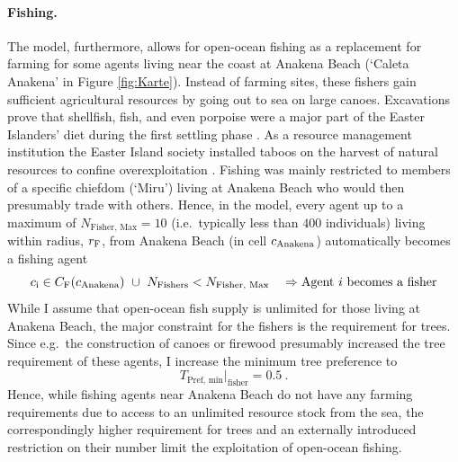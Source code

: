 \paragraph{Fishing.}
The model, furthermore, allows for open-ocean fishing as a replacement for farming for some agents living near the coast at Anakena Beach (`Caleta Anakena' in Figure \ref{fig:Karte}).
Instead of farming sites, these fishers gain sufficient agricultural resources by going out to sea on large canoes.
Excavations prove that shellfish, fish, and even porpoise were a major part of the Easter Islanders' diet during the first settling phase \citep{Bahn2017}.
As a resource management institution the Easter Island society installed taboos on the harvest of natural resources to confine overexploitation \citep{Good2006}. 
Fishing was mainly restricted to members of a specific chiefdom (`Miru') living at Anakena Beach \citep{Bahn2017} who would then presumably trade with others.
Hence, in the model, every agent up to a maximum of $N_\text{Fisher, Max} = 10$ (i.e.\ typically less than $400$ individuals) living within radius, $r_{\rm F}$, from Anakena Beach (in cell $c_{\rm Anakena}$) automatically becomes a fishing agent
\begin{equation}
 	c_{\rm i} \in C_{\rm F}(c_{\rm Anakena}) \  \cup \ N_\text{Fishers}<N_\text{Fisher, Max} \quad \Rightarrow \text{Agent }i\text{ becomes a fisher}
\end{equation}
While I assume that open-ocean fish supply is unlimited for those living at Anakena Beach, the major constraint for the fishers is the requirement for trees.
Since e.g.\ the construction of canoes or firewood presumably increased the tree requirement of these agents, I increase the minimum tree preference to
\begin{equation}
T_\text{Pref, min}|_\text{fisher} = 0.5 \ .
\end{equation} 
Hence, while fishing agents near Anakena Beach do not have any farming requirements due to access to an unlimited resource stock from the sea, the correspondingly higher requirement for trees and an externally introduced restriction on their number limit the exploitation of open-ocean fishing.

